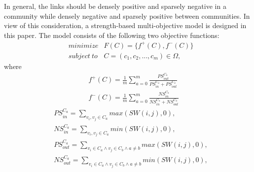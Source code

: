 \documentclass[10pt, journal]{IEEEtran}
\begin{document}
In general, the links should be densely positive and sparsely negative in a community while densely negative and sparsely positive between communities.  In view of this consideration, a strength-based multi-objective model is designed in this paper. The model consists of the following two objective functions:
\begin{eqnarray}
\label{eqn:bi-objective function}
&minimize&   F(C)=\{f^+(C),f^-(C)\} \nonumber\\
&subject\ to&   C=(c_1,c_2,...,c_m)\in \Omega,
\end{eqnarray}
where 
\begin{eqnarray}
\label{eqn:bi-objective functions}
&&   f^+(C)=\frac{1}{m}\sum\limits_{a = 0}^m \frac{PS_{out}^{C_a}}{PS_{in}^{C_a}+PS_{out}^{C_a}} \\
&&   f^-(C)=\frac{1}{m}\sum\limits_{a = 0}^m \frac{NS_{in}^{C_a}}{NS_{in}^{C_a}+NS_{out}^{C_a}}
\end{eqnarray}
\begin{align}
&PS_{in}^{C_a}=\sum_{v_i,v_j \in C_a } max(SW(i,j), 0),
\label{PSin} \\ 
&NS_{in}^{C_a}=\sum_{v_i,v_j \in C_a } min(SW(i,j),0),  \label{NSin} \\  
&PS_{out}^{C_a}=\sum_{v_i \in C_a \wedge v_j \in C_b \wedge a \neq b }max(SW(i,j),0), \label{PSout} \\ 
&NS_{out}^{C_a}=\sum_{v_i \in C_a \wedge v_j \in C_b \wedge a \neq b } min(SW(i,j),0), 
\label{NSout}
\end{align}
\end{document}
